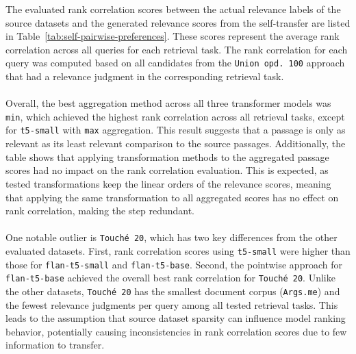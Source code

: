 The evaluated rank correlation scores between the actual relevance labels of the source datasets and the generated relevance scores from the self-transfer are listed in Table~\ref{tab:self-pairwise-preferences}. These scores represent the average rank correlation across all queries for each retrieval task. The rank correlation for each query was computed based on all candidates from the \texttt{Union opd.\ 100} approach that had a relevance judgment in the corresponding retrieval task.
\\\\
Overall, the best aggregation method across all three transformer models was \texttt{min}, which achieved the highest rank correlation across all retrieval tasks, except for \texttt{t5-small} with \texttt{max} aggregation. This result suggests that a passage is only as relevant as its least relevant comparison to the source passages. Additionally, the table shows that applying transformation methods to the aggregated passage scores had no impact on the rank correlation evaluation. This is expected, as tested transformations keep the linear orders of the relevance scores, meaning that applying the same transformation to all aggregated scores has no effect on rank correlation, making the step redundant.
\\\\
One notable outlier is \texttt{Touché 20}, which has two key differences from the other evaluated datasets. First, rank correlation scores using \texttt{t5-small} were higher than those for \texttt{flan-t5-small} and \texttt{flan-t5-base}. Second, the pointwise approach for \texttt{flan-t5-base} achieved the overall best rank correlation for \texttt{Touché 20}. Unlike the other datasets, \texttt{Touché 20} has the smallest document corpus (\texttt{Args.me}) and the fewest relevance judgments per query among all tested retrieval tasks. This leads to the assumption that source dataset sparsity can influence model ranking behavior, potentially causing inconsistencies in rank correlation scores due to few information to transfer.
